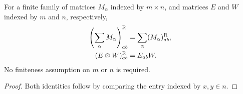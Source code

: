 \begin{lemma}
    \label{thm:two_marker_block_identities}
    \leanok
    For a finite family of matrices $M_\alpha$ indexed by $m\times n$, and
    matrices $E$ and $W$ indexed by $m$ and $n$, respectively,
    \begin{align}
        \left(\sum_\alpha M_\alpha\right)^{\mathrm R}_{ab}
                                      & =\sum_\alpha(M_\alpha)^{\mathrm R}_{ab},\notag \\
        (E\otimes W)^{\mathrm R}_{ab} & =E_{ab}W.
        \label{eq:two_marker_block_identities}
    \end{align}
    No finiteness assumption on $m$ or $n$ is required.
\end{lemma}
\begin{proof}\leanok
    Both identities follow by comparing the entry indexed by $x,y\in n$.
\end{proof}

